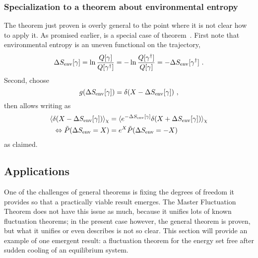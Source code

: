 \subsubsection{Specialization to a theorem about environmental entropy}

The theorem just proven is overly general to the point where it is not clear how to apply it. As promised earlier,  is a special case of theorem~. First note that environmental entropy is an uneven functional on the trajectory,
\begin{equation}
	  \Delta S_\text{env}[\gamma]
	= \ln\frac{Q[\gamma]}{Q[\gamma^\dagger]}
	= -\ln\frac{Q[\gamma^\dagger]}{Q[\gamma]}
	= -\Delta S_\text{env}[\gamma^\dagger] ~.
\end{equation}
%
Second, choose
\begin{equation}
	g(\Delta S_\text{env}[\gamma]) = \delta(X - \Delta S_\text{env}[\gamma]) ~,
\end{equation}
%
then  allows writing  as
%
\begin{align*}
		\langle \delta(X - \Delta S_\text{env}[\gamma])\rangle_\chi
		&=
		\langle e^{-\Delta S_\text{env}[\gamma]}\delta(X + \Delta S_\text{env}[\gamma])\rangle_\chi
	\\ \Leftrightarrow
		\tilde P(\Delta S_\text{env} = X)
		&=
		e^X \tilde P(\Delta S_\text{env} = -X)
\end{align*}
%
as claimed.





\subsection{Applications}

One of the challenges of general theorems is fixing the degrees of freedom it provides so that a practically viable result emerges. The Master Fluctuation Theorem \cite{seifert-review} does not have this issue as much, because it unifies lots of known fluctuation theorems; in the present case however, the general theorem is proven, but what it unifies or even describes is not so clear. This section will provide an example of one emergent result: a fluctuation theorem for the energy set free after sudden cooling of an equilibrium system.

